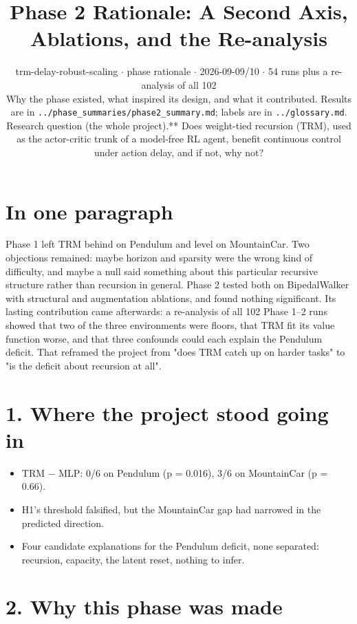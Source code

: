 \documentclass[11pt]{article}
\title{Phase 2 Rationale: A Second Axis, Ablations, and the Re-analysis}
\author{}
\date{trm-delay-robust-scaling $\cdot$ phase rationale $\cdot$ 2026-09-09/10 $\cdot$ 54 runs plus a re-analysis of all 102\\[2pt]Why the phase existed, what inspired its design, and what it contributed. Results are in \texttt{.\allowbreak{}.\allowbreak{}/\allowbreak{}phase\_\allowbreak{}summaries/\allowbreak{}phase2\_\allowbreak{}summary.\allowbreak{}md}; labels are in \texttt{.\allowbreak{}.\allowbreak{}/\allowbreak{}glossary.\allowbreak{}md}.\\[2pt]Research question (the whole project).** Does weight-tied recursion (TRM), used as the actor-critic trunk of a model-free RL agent, benefit continuous control under action delay, and if not, why not?}
\begin{document}
\maketitle
\section*{In one paragraph}



Phase 1 left TRM behind on Pendulum and level on MountainCar. Two objections remained: maybe horizon and sparsity were the wrong kind of difficulty, and maybe a null said something about this particular recursive structure rather than recursion in general. Phase 2 tested both on BipedalWalker with structural and augmentation ablations, and found nothing significant. Its lasting contribution came afterwards: a re-analysis of all 102 Phase 1--2 runs showed that two of the three environments were floors, that TRM fit its value function worse, and that three confounds could each explain the Pendulum deficit. That reframed the project from "does TRM catch up on harder tasks" to "is the deficit about recursion at all".



\section*{1. Where the project stood going in}



\begin{itemize}
\item TRM $-$ MLP: 0/6 on Pendulum (p = 0.016), 3/6 on MountainCar (p = 0.66).
\item H1's threshold falsified, but the MountainCar gap had narrowed in the predicted direction.
\item Four candidate explanations for the Pendulum deficit, none separated: recursion, capacity, the latent reset, nothing to infer.
\end{itemize}



\section*{2. Why this phase was made}
\end{document}
